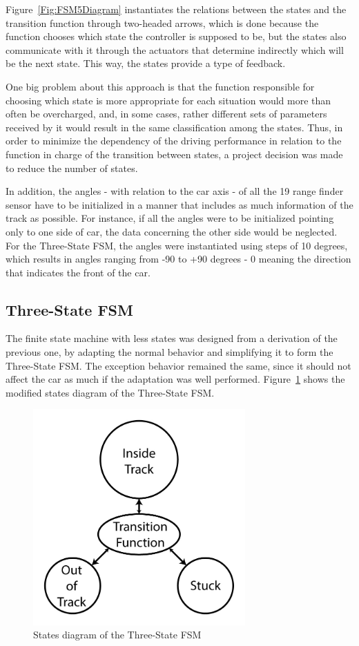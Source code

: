 	Figure~\ref{Fig:FSM5Diagram} instantiates the relations between the states and the transition function through two-headed arrows, which is done because the function chooses which state the controller is supposed to be, but the states also communicate with it through the actuators that determine indirectly which will be the next state. This way, the states provide a type of feedback.
	
	One big problem about this approach is that the function responsible for choosing which state is more appropriate for each situation would more than often be overcharged, and, in some cases, rather different sets of parameters received by it would result in the same classification among the states. Thus, in order to minimize the dependency of the driving performance in relation to the function in charge of the transition between states, a project decision was made to reduce the number of states.
	
	In addition, the angles - with relation to the car axis - of all the 19 range finder sensor have to be initialized in a manner that includes as much information of the track as possible. For instance, if all the angles were to be initialized pointing only to one side of car, the data concerning the other side would be neglected. For the Three-State FSM, the angles were instantiated using steps of 10 degrees, which results in angles ranging from -90 to +90 degrees - 0 meaning the direction that indicates the front of the car.
		
\subsection{Three-State FSM} \label{subsec:FSM3}
	
	The finite state machine with less states was designed from a derivation of the previous one, by adapting the normal behavior and simplifying it to form the Three-State FSM. The exception behavior remained the same, since it should not affect the car as much if the adaptation was well performed. Figure~\ref{Fig:FSM3Diagram} shows the modified states diagram of the Three-State FSM.
	
	\begin{figure}[h]
		
		\centering
		\includegraphics[width=230pt]{ThreeStateFSM}
		\caption{States diagram of the Three-State FSM}
		\label{Fig:FSM3Diagram}
		
	\end{figure}
	

